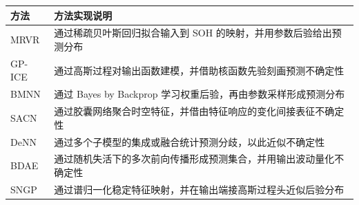 \documentclass[printcopy,fontset=windows]{../Style/neuthesis}
\begin{document}
\begin{table}[p]
  \centering
  \label{tab:hsstt_methods}
  \begin{threeparttable}
    \begin{tabularx}{\textwidth}{>{\raggedright\arraybackslash}p{}Z}
      \toprule
      方法 & 方法实现说明 \\
      \midrule
      MRVR &
      通过稀疏贝叶斯回归拟合输入到 SOH 的映射，并用参数后验给出预测分布 \\
      GP-ICE &
      通过高斯过程对输出函数建模，并借助核函数先验刻画预测不确定性 \\
      BMNN &
      通过 Bayes by Backprop 学习权重后验，再由参数采样形成预测分布 \\
      SACN &
      通过胶囊网络聚合时空特征，并借由特征响应的变化间接表征不确定性 \\
      DeNN &
      通过多个子模型的集成或融合统计预测分歧，以此近似不确定性 \\
      BDAE &
      通过随机失活下的多次前向传播形成预测集合，并用输出波动量化不确定性 \\
      SNGP &
      通过谱归一化稳定特征映射，并在输出端接高斯过程头近似后验分布 \\
      \bottomrule
    \end{tabularx}
  \end{threeparttable}
\end{table}
\clearpage
\end{document}
